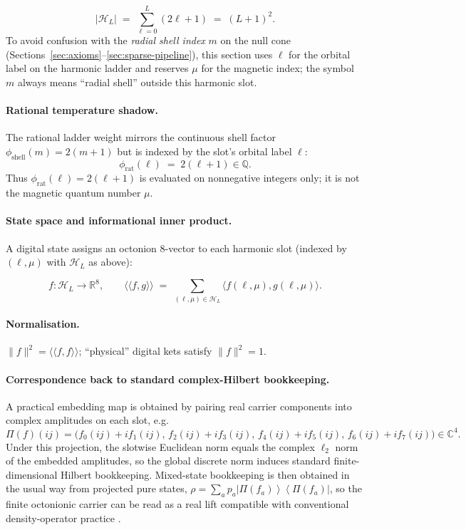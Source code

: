 \documentclass[11pt,a4paper]{article}
\theoremstyle{remark}
\begin{document}
\begin{equation}
  |\mathcal{H}_L| \;=\; \sum_{\ell=0}^{L} (2\ell+1) \;=\; (L+1)^2.
\end{equation}
To avoid confusion with the \emph{radial shell index} $m$ on the null cone (Sections~\ref{sec:axioms}--\ref{sec:sparse-pipeline}), this section uses $\ell$ for the orbital label on the harmonic ladder and reserves $\mu$ for the magnetic index; the symbol $m$ always means ``radial shell'' outside this harmonic slot.

\paragraph{Rational temperature shadow.}
The rational ladder weight mirrors the continuous shell factor $\phi_{\mathrm{shell}}(m)=2(m+1)$ but is indexed by the slot's orbital label $\ell$:
\begin{equation}
  \phi_{\mathrm{rat}}(\ell) \;=\; 2(\ell+1)\in\mathbb{Q}.
\end{equation}
Thus $\phi_{\mathrm{rat}}(\ell)=2(\ell+1)$ is evaluated on nonnegative integers only; it is not the magnetic quantum number $\mu$.

\paragraph{State space and informational inner product.}
A digital state assigns an octonion $8$-vector to each harmonic slot (indexed by $(\ell,\mu)$ with $\mathcal{H}_L$ as above):

\begin{equation}
  f:\mathcal{H}_L \to \mathbb{R}^8,
  \qquad
  \langle\!\langle f,g\rangle\!\rangle \;=\; \sum_{(\ell,\mu)\in\mathcal{H}_L} \langle f(\ell,\mu),g(\ell,\mu)\rangle.
\end{equation}

\paragraph{Normalisation.}
$\|f\|^2=\langle\!\langle f,f\rangle\!\rangle$; ``physical'' digital kets satisfy $\|f\|^2=1$.

\paragraph{Correspondence back to standard complex-Hilbert bookkeeping.}
A practical embedding map is obtained by pairing real carrier components into complex amplitudes on each slot, e.g.
\[
  \Pi(f)(ij) = \bigl(f_0(ij)+i f_1(ij),\, f_2(ij)+i f_3(ij),\, f_4(ij)+i f_5(ij),\, f_6(ij)+i f_7(ij)\bigr)\in\mathbb{C}^4.
\]
Under this projection, the slotwise Euclidean norm equals the complex $\ell_2$ norm of the embedded amplitudes, so the global discrete norm induces standard finite-dimensional Hilbert bookkeeping. Mixed-state bookkeeping is then obtained in the usual way from projected pure states, $\rho=\sum_a p_a \left|\Pi(f_a)\right\rangle\!\left\langle\Pi(f_a)\right|$, so the finite octonionic carrier can be read as a real lift compatible with conventional density-operator practice \cite{vonNeumann1955,dirac1930}.
\end{document}
